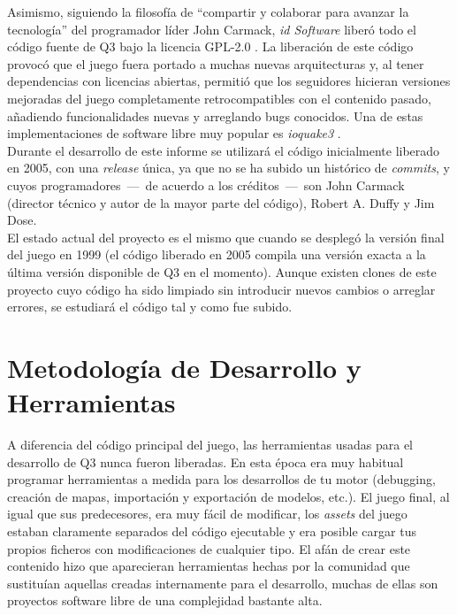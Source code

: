 \documentclass[a4paper,12pt]{report}
\begin{document}
	Asimismo, siguiendo la filosofía de ``compartir y colaborar para avanzar la tecnología'' del programador líder John Carmack, \textit{id Software} liberó todo el código fuente de Q3 bajo la licencia GPL-2.0 \cite{sourcecode}. La liberación de este código provocó que el juego fuera portado a muchas nuevas arquitecturas y, al tener dependencias con licencias abiertas, permitió que los seguidores hicieran versiones mejoradas del juego completamente retrocompatibles con el contenido pasado, añadiendo funcionalidades nuevas y arreglando bugs conocidos. Una de estas implementaciones de software libre muy popular es \textit{ioquake3} \cite{ioquake3}. \\
	
	Durante el desarrollo de este informe se utilizará el código inicialmente liberado en 2005, con una \textit{release} única, ya que no se ha subido un histórico de \textit{commits}, y cuyos programadores  \,---\, de acuerdo a los créditos \,---\, son John Carmack (director técnico y autor de la mayor parte del código), Robert A. Duffy y Jim Dose.\\
	
	El estado actual del proyecto es el mismo que cuando se desplegó la versión final del juego en 1999 (el código liberado en 2005 compila una versión exacta a la última versión disponible de Q3 en el momento). Aunque existen clones de este proyecto cuyo código ha sido limpiado sin introducir nuevos cambios o arreglar errores, se estudiará el código tal y como fue subido.\\
	
	
	\section{Metodología de Desarrollo y Herramientas}
	A diferencia del código principal del juego, las herramientas usadas para el desarrollo de Q3 nunca fueron liberadas. En esta época era muy habitual programar herramientas a medida para los desarrollos de tu motor (debugging, creación de mapas, importación y exportación de modelos, etc.). El juego final, al igual que sus predecesores, era muy fácil de modificar, los \textit{assets} del juego estaban claramente separados del código ejecutable y era posible cargar tus propios ficheros con modificaciones de cualquier tipo. El afán de crear este contenido hizo que aparecieran herramientas hechas por la comunidad que sustituían aquellas creadas internamente para el desarrollo, muchas de ellas son proyectos software libre de una complejidad bastante alta.\\
	
\end{document}

